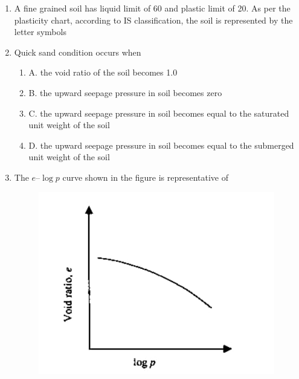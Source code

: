 \documentclass[journal,12pt,onecolumn]{IEEEtran}
\theoremstyle{remark}
\begin{document}
\begin{enumerate}
\begin{enumerate}
\begin{multicols}{4}
\end{multicols}
\end{enumerate}
\noindent\item A fine grained soil has liquid limit of 60 and plastic limit of 20. As per the plasticity chart, according to IS classification, the soil is represented by the letter symbols 
\hfill{}
\begin{enumerate}
\end{enumerate}
\noindent\item Quick sand condition occurs when 
\hfill{}


\begin{enumerate}[label=]
 \item A. the void ratio of the soil becomes 1.0 
 \item B. the upward seepage pressure in soil becomes zero 
 \item C. the upward seepage pressure in soil becomes equal to the saturated unit weight of the soil 
 \item D. the upward seepage pressure in soil becomes equal to the submerged unit weight of the soil
 \end{enumerate}


\noindent\item The $e$--$\log p$ curve shown in the figure is representative of 
\hfill{}

\begin{figure}[H]
     \centering
     \includegraphics[scale=0.5]{figs/3e0ddfff-16d6-49d4-a917-0f59027d78f5.jpg} 
     \caption{}
     \label{fig:figure2}
 \end{figure}
    

\end{enumerate}
\end{document}
